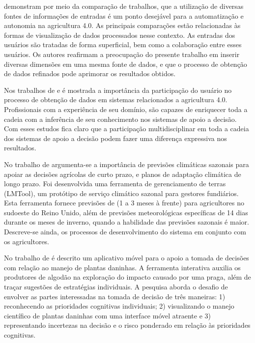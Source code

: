 \documentclass[12pt]{article}
\begin{document}
 demonstram por meio da comparação de trabalhos, que a utilização de diversas fontes de informações de entradas é um ponto desejável para a automatização e autonomia na agricultura 4.0. As principais comparações estão relacionadas às formas de visualização de dados processados nesse contexto. As entradas dos usuários são tratadas de forma superficial, bem como a colaboração entre esses usuários. Os autores reafirmam a preocupação do presente trabalho em inserir diversas dimensões em uma mesma fonte de dados, e que o processo de obtenção de dados refinados pode aprimorar os resultados obtidos.

Nos trabalhos de  e  é mostrada a importância da participação do usuário no processo de obtenção de dados em sistemas relacionados a agricultura 4.0. Profissionais com a experiência de seu domínio, são capazes de enriquecer toda a cadeia com a inferência de seu conhecimento nos sistemas de apoio a decisão. Com esses estudos fica claro que a participação multidisciplinar em toda a cadeia dos sistemas de apoio a decisão podem fazer uma diferença expressiva nos resultados.

No trabalho de  argumenta-se a importância de previsões climáticas sazonais para apoiar as decisões agrícolas de curto prazo, e planos de adaptação climática de longo prazo. Foi desenvolvida uma ferramenta de gerenciamento de terras (LMTool), um protótipo de serviço climático sazonal para gestores fundiários. Esta ferramenta fornece previsões de (1 a 3 meses à frente) para agricultores no sudoeste do Reino Unido, além de previsões meteorológicas específicas de 14 dias durante os meses de inverno, quando a habilidade das previsões sazonais é maior. Descreve-se ainda, os processos de desenvolvimento do sistema em conjunto com os agricultores.

No trabalho de  é descrito um aplicativo móvel para o apoio a tomada de decisões com relação ao manejo de plantas daninhas. A ferramenta interativa auxilia os produtores de algodão na exploração do impacto causado por uma praga, além de traçar sugestões de estratégias individuais. A pesquisa aborda o desafio de envolver as partes interessadas na tomada de decisão de três maneiras: 1) reconhecendo as prioridades cognitivas individuais; 2) visualizando o manejo científico de plantas daninhas com uma interface móvel atraente e 3) representando incertezas na decisão e o risco ponderado em relação às prioridades cognitivas.
\end{document}
